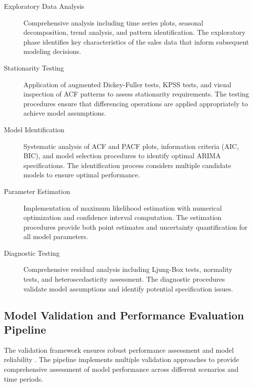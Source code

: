		\begin{description}
			\item[Exploratory Data Analysis] Comprehensive analysis including time series plots, seasonal decomposition, trend analysis, and pattern identification. The exploratory phase identifies key characteristics of the sales data that inform subsequent modeling decisions.
			\item[Stationarity Testing] Application of augmented Dickey-Fuller tests, KPSS tests, and visual inspection of ACF patterns to assess stationarity requirements. The testing procedures ensure that differencing operations are applied appropriately to achieve model assumptions.
			\item[Model Identification] Systematic analysis of ACF and PACF plots, information criteria (AIC, BIC), and model selection procedures to identify optimal ARIMA specifications. The identification process considers multiple candidate models to ensure optimal performance.
			\item[Parameter Estimation] Implementation of maximum likelihood estimation with numerical optimization and confidence interval computation. The estimation procedures provide both point estimates and uncertainty quantification for all model parameters.
			\item[Diagnostic Testing] Comprehensive residual analysis including Ljung-Box tests, normality tests, and heteroscedasticity assessment. The diagnostic procedures validate model assumptions and identify potential specification issues.
		\end{description}
		
		\subsection{Model Validation and Performance Evaluation Pipeline}
		
		The validation framework ensures robust performance assessment and model reliability \cite{Montgomery:2008}. The pipeline implements multiple validation approaches to provide comprehensive assessment of model performance across different scenarios and time periods.
		
